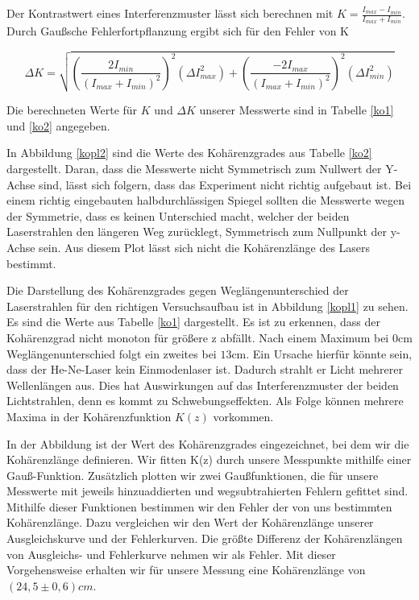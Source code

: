 \documentclass[12pt,a4paper]{article}
\begin{document}
Der Kontrastwert eines Interferenzmuster lässt sich berechnen mit $K = \frac{I_{max} - I_{min}}{I_{max} + I_{min}}$. Durch Gaußsche Fehlerfortpflanzung ergibt sich für den Fehler von K

\begin{equation}
	\Delta K = \sqrt{\left(\frac{2I_{min}}{(I_{max} + I_{min})^2}\right)^2(\Delta I_{max}^2) + \left(\frac{-2I_{max}}{(I_{max} + I_{min})^2}\right)^2(\Delta I_{min}^2)}
\end{equation}

Die berechneten Werte für $K$ und $\Delta K$ unserer Messwerte sind in Tabelle \ref{ko1} und \ref{ko2} angegeben.

In Abbildung \ref{kopl2} sind die Werte des Kohärenzgrades aus Tabelle \ref{ko2} dargestellt. Daran, dass die Messwerte nicht Symmetrisch zum Nullwert der Y-Achse sind, lässt sich folgern, dass das Experiment nicht richtig aufgebaut ist. Bei einem richtig eingebauten halbdurchlässigen Spiegel sollten die Messwerte wegen der Symmetrie, dass es keinen Unterschied macht, welcher der beiden Laserstrahlen den längeren Weg zurücklegt, Symmetrisch zum Nullpunkt der y-Achse sein. Aus diesem Plot lässt sich nicht die Kohärenzlänge des Lasers bestimmt.

Die Darstellung des Kohärenzgrades gegen Weglängenunterschied der Laserstrahlen für den richtigen Versuchsaufbau ist in Abbildung \ref{kopl1} zu sehen. Es sind die Werte aus Tabelle \ref{ko1} dargestellt. Es ist zu erkennen, dass der Kohärenzgrad nicht monoton für größere z abfällt. Nach einem Maximum bei $0$cm Weglängenunterschied folgt ein zweites bei $13$cm. Ein Ursache hierfür könnte sein, dass der He-Ne-Laser kein Einmodenlaser ist. Dadurch strahlt er Licht mehrerer Wellenlängen aus. Dies hat Auswirkungen auf das Interferenzmuster der beiden Lichtstrahlen, denn es kommt zu Schwebungseffekten. Als Folge können mehrere Maxima in der Kohärenzfunktion $K(z)$ vorkommen.

In der Abbildung ist der Wert des Kohärenzgrades eingezeichnet, bei dem wir die Kohärenzlänge definieren. Wir fitten K(z) durch unsere Messpunkte mithilfe einer Gauß-Funktion. Zusätzlich plotten wir zwei Gaußfunktionen, die für unsere Messwerte mit jeweils hinzuaddierten und wegsubtrahierten Fehlern gefittet sind. Mithilfe dieser Funktionen bestimmen wir den Fehler der von uns bestimmten Kohärenzlänge. Dazu vergleichen wir den Wert der Kohärenzlänge unserer Ausgleichskurve und der Fehlerkurven. Die größte Differenz der Kohärenzlängen von Ausgleichs- und Fehlerkurve nehmen wir als Fehler. Mit dieser Vorgehensweise erhalten wir für unsere Messung eine Kohärenzlänge von $(24,5 \pm 0,6)cm$.
\end{document}
